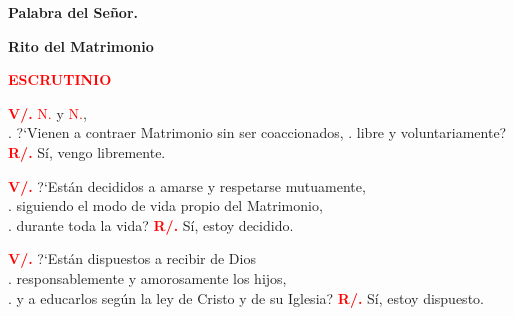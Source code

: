 \documentclass[12pt, letterpaper, spanish]{report}
\begin{document}
{\bfseries Palabra del Se\~nor.} \newline

\newpage

\begin{center}
\Huge {\bfseries Rito del Matrimonio}
\end{center}

\vspace{1cm}

\Large {\bfseries \textcolor{red}{ESCRUTINIO}} \newline

\Large \hspace{-0.9cm} {\bfseries \textcolor{red}{V/.}} \hspace{0.5cm} \textcolor{red}{N.} y \textcolor{red}{N.}, \\
.\hspace{1.5cm} ?`Vienen a contraer Matrimonio sin ser coaccionados, \newline
.\hspace{1.5cm}  libre y voluntariamente? \newline
\Large {\bfseries \textcolor{red}{R/.}} \hspace{0.5cm} S\'i, vengo libremente. \newline

\Large \hspace{-0.9cm}  {\bfseries \textcolor{red}{V/.}} \hspace{0.5cm} ?`Est\'an decididos a amarse y respetarse mutuamente, \\
.\hspace{1.5cm} siguiendo el modo de vida propio del Matrimonio, \\
.\hspace{1.5cm} durante toda la vida? \newline
\Large {\bfseries \textcolor{red}{R/.}} \hspace{0.5cm} S\'i, estoy decidido. \newline

\Large \hspace{-0.9cm} {\bfseries \textcolor{red}{V/.}} \hspace{0.5cm} ?`Est\'an dispuestos a recibir de Dios \\
.\hspace{1.5cm} responsablemente y amorosamente los hijos, \\
.\hspace{1.5cm} y a educarlos seg\'un la ley de Cristo y de su Iglesia? \newline
\Large {\bfseries \textcolor{red}{R/.}} \hspace{0.5cm} S\'i, estoy dispuesto. \newline
\end{document}

